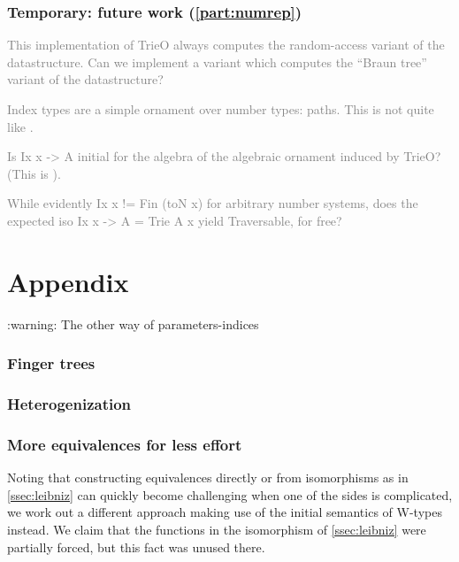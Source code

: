 \documentclass[10pt]{article}
\theoremstyle{plain}
\theoremstyle{definition}
\newcommand{\investigate}[1]{\par\vspace{1\baselineskip}\textcolor{gray}{#1}\vspace{1\baselineskip}\par}
\begin{document}
\section{Temporary: future work (\autoref{part:numrep})}

\investigate{This implementation of TrieO always computes the random-access variant of the datastructure. Can we implement a variant which computes the ``Braun tree'' variant of the datastructure?}

\investigate{Index types are a simple ornament over number types: paths. This is not quite like \cite{glookup}.}

\investigate{Is Ix x -> A initial for the algebra of the algebraic ornament induced by TrieO? (This is \cite{calcdata}).}

\investigate{While evidently Ix x != Fin (toN x) for arbitrary number systems, does the expected iso Ix x -> A = Trie A x yield Traversable, for free?}



\printbibliography

\part{Appendix}
\begin{outline}
    :warning: The other way of parameters-indices
\end{outline}

\appendix

\section{Finger trees}
%

\section{Heterogenization}
%


\section{More equivalences for less effort}\label{sec:userfriendly}
Noting that constructing equivalences directly or from isomorphisms as in \autoref{ssec:leibniz} can quickly become challenging when one of the sides is complicated, we work out a different approach making use of the initial semantics of W-types instead. We claim that the functions in the isomorphism of \autoref{ssec:leibniz} were partially forced, but this fact was unused there.
\end{document}
